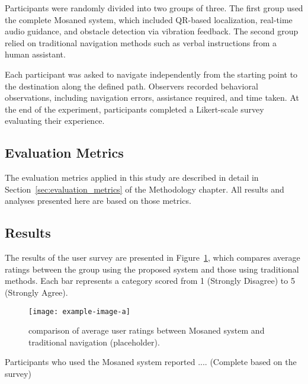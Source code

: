 Participants were randomly divided into two groups of three. The first group used the complete Mosaned system, which included QR-based localization, real-time audio guidance, and obstacle detection via vibration feedback. The second group relied on traditional navigation methods such as verbal instructions from a human assistant.

Each participant was asked to navigate independently from the starting point to the destination along the defined path. Observers recorded behavioral observations, including navigation errors, assistance required, and time taken. At the end of the experiment, participants completed a Likert-scale survey evaluating their experience.

\subsection{Evaluation Metrics}

The evaluation metrics applied in this study are described in detail in Section~\ref{sec:evaluation_metrics} of the Methodology chapter. All results and analyses presented here are based on those metrics.


\subsection{Results}

The results of the user survey are presented in Figure~\ref{fig:user_survey}, which compares average ratings between the group using the proposed system and those using traditional methods. Each bar represents a category scored from 1 (Strongly Disagree) to 5 (Strongly Agree).

\begin{figure}[h]
	\centering
	\texttt{[image: example-image-a]}
	\caption{comparison of average user ratings between Mosaned system and traditional navigation (placeholder).}
	\label{fig:user_survey}
\end{figure}

Participants who used the Mosaned system reported .... (Complete based on the survey)
